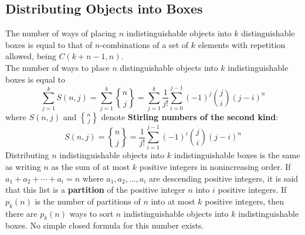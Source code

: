 \documentclass[./Discrete Math.tex]{subfiles}
\begin{document}
		\subsection{Distributing Objects into Boxes}
			The number of ways of placing \(n\) indistinguishable objects into \(k\) distinguishable boxes is equal to that of \(n\)-combinations of a set of \(k\) elements with repetition allowed, being \(C(k + n - 1, n)\). \\
			The number of ways to place \(n\) distinguishable objects into \(k\) indistinguishable boxes is equal to
				\[
					\sum_{j = 1}^k S(n, j) = \sum_{j = 1}^k {n \brace j} 
							= \sum_{j = 1}^k \frac{1}{j!}\sum_{i = 0}^{j - 1}(-1)^j\binom{j}{i}(j - i)^n
				\]
				where \(S(n, j)\) and \({n \brace j}\) denote \textbf{Stirling numbers of the second kind}:
				\[S(n, j) = {n \brace j} = \frac{1}{j!}\sum_{i = 1}^{j - 1}(-1)^i\binom{j}{i}(j - i)^n\]
			Distributing \(n\) indistinguishable objects into \(k\) indistinguishable boxes is the same as writing \(n\) as the sum of at most \(k\) positive integers in nonincreasing order. If \(a_1 + a_2 + \cdots + a_i = n\) where \(a_1, a_2, \ldots, a_i\) are descending positive integers, it is said that this list is a \textbf{partition} of the positive integer \(n\) into \(i\) positive integers. If \(p_k(n)\) is the number of partitions of \(n\) into at most \(k\) positive integers, then there are \(p_k(n)\) ways to sort \(n\) indistinguishable objects into \(k\) indistinguishable boxes. No simple closed formula for this number exists.
\end{document}
